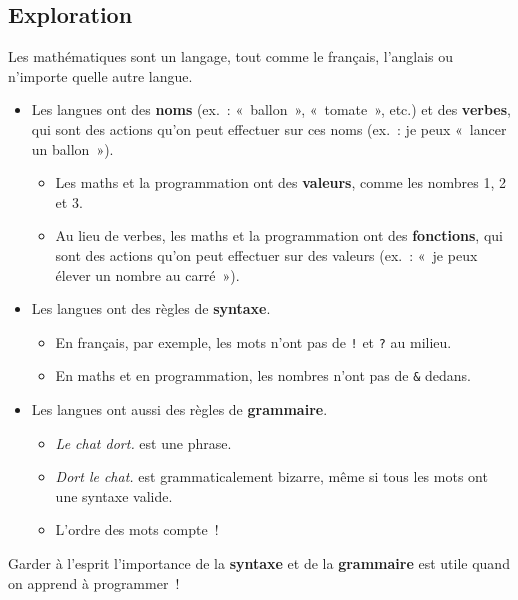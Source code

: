 \documentclass[12pt,a4paper]{article}
\begin{document}
\subsection{Exploration}

Les mathématiques sont un langage, tout comme le français, l'anglais ou n'importe quelle autre langue.

\begin{itemize}
  \item Les langues ont des \textbf{noms} (ex.~: «~ballon~», «~tomate~», etc.) et des \textbf{verbes}, qui sont des actions qu'on peut effectuer sur ces noms (ex.~: je peux «~lancer un ballon~»).
  \begin{itemize}
    \item Les maths et la programmation ont des \textbf{valeurs}, comme les nombres 1, 2 et 3.
    \item Au lieu de verbes, les maths et la programmation ont des \textbf{fonctions}, qui sont des actions qu'on peut effectuer sur des valeurs (ex.~: «~je peux élever un nombre au carré~»).
  \end{itemize}

  \item Les langues ont des règles de \textbf{syntaxe}.
  \begin{itemize}
    \item En français, par exemple, les mots n'ont pas de \texttt{!} et \texttt{?} au milieu.
    \item En maths et en programmation, les nombres n'ont pas de \texttt{\&} dedans.
  \end{itemize}

  \item Les langues ont aussi des règles de \textbf{grammaire}.
  \begin{itemize}
    \item \emph{Le chat dort.} est une phrase.
    \item \emph{Dort le chat.} est grammaticalement bizarre, même si tous les mots ont une syntaxe valide.
    \item L'ordre des mots compte~!
  \end{itemize}
\end{itemize}

\begin{keypointbox}
  Garder à l'esprit l'importance de la \textbf{syntaxe} et de la \textbf{grammaire} est utile quand on apprend à programmer~!
\end{keypointbox}
\end{document}
